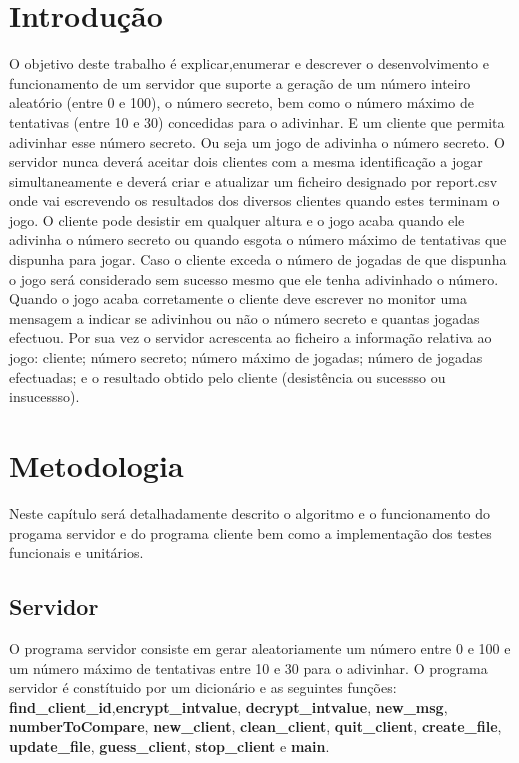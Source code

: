\documentclass{report}
\begin{document}
\tableofcontents


\clearpage
{}

\chapter{Introdução}
\label{chap.introducao}
O objetivo deste trabalho é explicar,enumerar e descrever o desenvolvimento e funcionamento de um servidor que suporte a geração de um número inteiro aleatório (entre 0 e 100), o número secreto, bem como o número máximo de tentativas (entre 10 e 30) concedidas para o adivinhar. E um cliente que permita adivinhar esse número secreto. Ou seja um jogo de adivinha o número secreto.
O servidor nunca deverá aceitar dois clientes com a mesma identificação a jogar simultaneamente e deverá criar e atualizar um ficheiro designado por report.csv onde vai escrevendo os resultados dos diversos clientes quando estes terminam o jogo. O cliente pode desistir em qualquer altura e o jogo acaba quando ele adivinha o número secreto ou quando esgota o número máximo de tentativas que dispunha para jogar. Caso o cliente exceda o número de jogadas de que dispunha o jogo será considerado sem sucesso mesmo que ele tenha adivinhado o número. Quando o jogo acaba corretamente o cliente deve escrever no monitor uma mensagem a indicar se adivinhou ou não o número secreto e quantas jogadas efectuou. Por sua vez o servidor acrescenta ao ficheiro a informação relativa ao jogo: cliente; número secreto; número máximo de jogadas; número de jogadas efectuadas; e o resultado obtido pelo cliente (desistência ou sucessso ou insucessso).

\chapter{Metodologia}
\label{chap.metodologia}
Neste capítulo será detalhadamente descrito o algoritmo e o funcionamento do progama servidor e do programa cliente bem como a implementação dos testes funcionais e unitários.
\section{Servidor}
O programa servidor consiste em gerar aleatoriamente um número entre 0 e 100 e um número máximo de tentativas entre 10 e 30 para o adivinhar. 
	O programa servidor é constítuido por um dicionário e as seguintes funções: \textbf{find\_client\_id},\textbf{encrypt\_intvalue}, \textbf{decrypt\_intvalue}, \textbf{new\_msg}, \textbf{numberToCompare}, \textbf{new\_client}, \textbf{clean\_client}, \textbf{quit\_client}, \textbf{create\_file}, \textbf{update\_file}, \textbf{guess\_client}, \textbf{stop\_client} e \textbf{main}.
\end{document}

